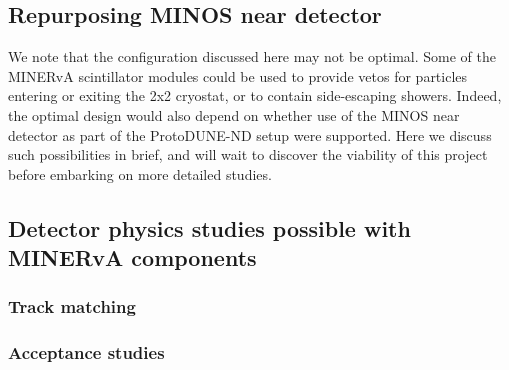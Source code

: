 \subsection{Repurposing MINOS near detector}

We note that the configuration discussed here may not be optimal. Some of the MINERvA scintillator modules could be used to provide vetos for particles entering or exiting the 2x2 cryostat, or to contain side-escaping showers. Indeed, the optimal design would also depend on whether use of the MINOS near detector as part of the ProtoDUNE-ND setup were supported. Here we discuss such possibilities in brief, and will wait to discover the viability of this project before embarking on more detailed studies.

\subsection{Detector physics studies possible with MINERvA components}

\subsubsection{Track matching}

\subsubsection{Acceptance studies}

